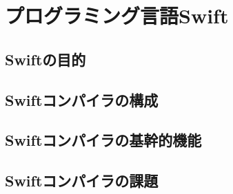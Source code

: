 \chapter{プログラミング言語Swift}
\label{rw}

\section{Swiftの目的}
\label{rw:pointtopoint}


\section{Swiftコンパイラの構成}
\label{background:korekara}

\section{Swiftコンパイラの基幹的機能}

\section{Swiftコンパイラの課題}


